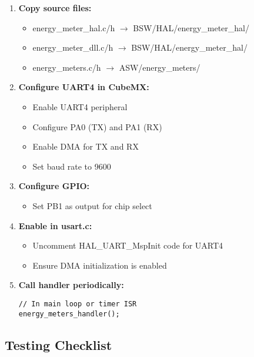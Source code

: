 \documentclass[11pt,a4paper]{article}
\begin{document}
\begin{enumerate}
    \item \textbf{Copy source files:}
    \begin{itemize}
        \item energy\_meter\_hal.c/h $\rightarrow$ BSW/HAL/energy\_meter\_hal/
        \item energy\_meter\_dll.c/h $\rightarrow$ BSW/HAL/energy\_meter\_hal/
        \item energy\_meters.c/h $\rightarrow$ ASW/energy\_meters/
    \end{itemize}

    \item \textbf{Configure UART4 in CubeMX:}
    \begin{itemize}
        \item Enable UART4 peripheral
        \item Configure PA0 (TX) and PA1 (RX)
        \item Enable DMA for TX and RX
        \item Set baud rate to 9600
    \end{itemize}

    \item \textbf{Configure GPIO:}
    \begin{itemize}
        \item Set PB1 as output for chip select
    \end{itemize}

    \item \textbf{Enable in usart.c:}
    \begin{itemize}
        \item Uncomment HAL\_UART\_MspInit code for UART4
        \item Ensure DMA initialization is enabled
    \end{itemize}

    \item \textbf{Call handler periodically:}
\begin{lstlisting}
// In main loop or timer ISR
energy_meters_handler();
\end{lstlisting}
\end{enumerate}

\subsection{Testing Checklist}
\end{document}
